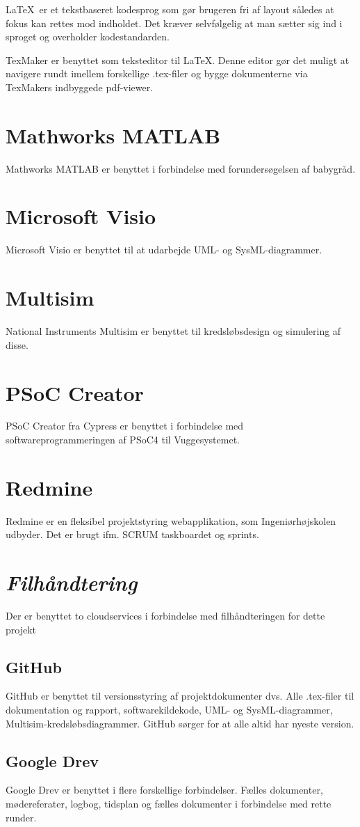 \LaTeX \ er et tekstbaseret kodesprog som gør brugeren fri af layout således at fokus kan rettes mod indholdet. Det kræver selvfølgelig at man sætter sig ind i sproget og overholder kodestandarden. 

TexMaker er benyttet som teksteditor til \LaTeX. Denne editor gør det muligt at navigere rundt imellem forskellige .tex-filer og bygge dokumenterne via TexMakers indbyggede pdf-viewer.

\section*{Mathworks MATLAB}
Mathworks MATLAB er benyttet i forbindelse med forundersøgelsen af babygråd. 

\section*{Microsoft Visio}
Microsoft Visio er benyttet til at udarbejde UML- og SysML-diagrammer. 

\section*{Multisim}
National Instruments Multisim er benyttet til kredsløbsdesign og simulering af disse. 

\section*{PSoC Creator}
PSoC Creator fra Cypress er benyttet i forbindelse med softwareprogrammeringen af PSoC4 til Vuggesystemet. 

\section*{Redmine}
Redmine er en fleksibel projektstyring webapplikation, som Ingeniørhøjskolen udbyder. Det er brugt ifm. SCRUM taskboardet og sprints.

\section*{\textit{Filhåndtering}}
Der er benyttet to cloudservices i forbindelse med filhåndteringen for dette projekt

\subsection*{GitHub}
GitHub er benyttet til versionsstyring af projektdokumenter dvs. Alle .tex-filer til dokumentation og rapport, softwarekildekode, UML- og SysML-diagrammer, Multisim-kredsløbsdiagrammer. GitHub sørger for at alle altid har nyeste version. 

\subsection*{Google Drev}
Google Drev er benyttet i flere forskellige forbindelser. Fælles dokumenter, mødereferater, logbog, tidsplan og fælles dokumenter i forbindelse med rette runder.